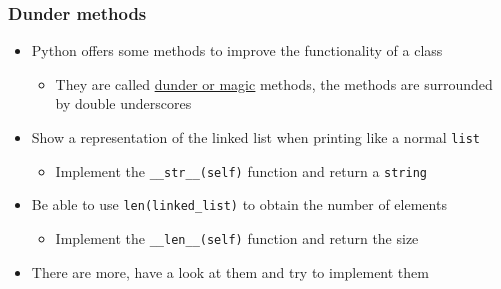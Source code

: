 \documentclass[11pt]{beamer}
\begin{document}
	\begin{frame}[fragile]
		\frametitle{Dunder methods}
		\begin{itemize}
			\item Python offers some methods to improve the functionality of a class
			\begin{itemize}
				\item They are called \href{https://docs.python.org/3/reference/datamodel.html#special-method-names}{{\color{blue}\underline{dunder or magic}}} methods, the methods are surrounded by double underscores
			\end{itemize}
			\item Show a representation of the linked list when printing like a normal \texttt{list}
			\begin{itemize}
				\item Implement the \lstinline|__str__(self)| function and return a \texttt{string}
			\end{itemize}
			\item Be able to use \lstinline|len(linked_list)| to obtain the number of elements
			\begin{itemize}
				\item Implement the \lstinline|__len__(self)| function and return the size
			\end{itemize}
			\item There are more, have a look at them and try to implement them
		\end{itemize}
	\end{frame}
\end{document}
